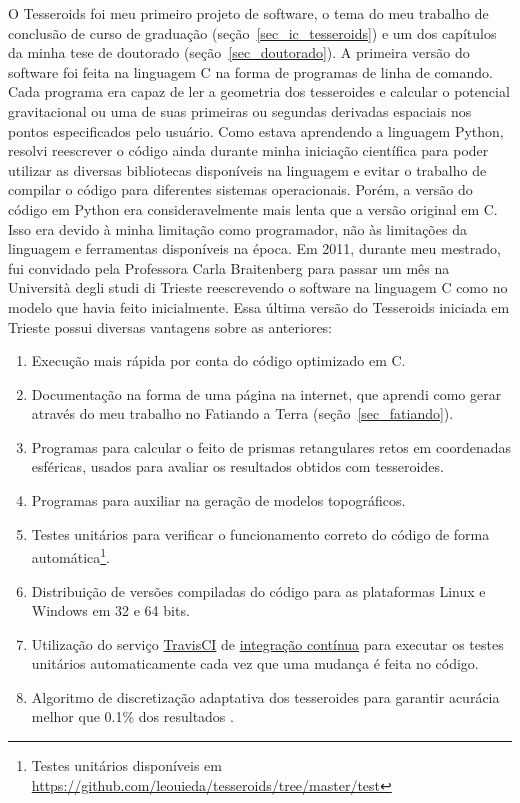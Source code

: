 \documentclass[10pt,a4paper,oneside]{book}
\newcommand{\Trieste}{Università degli studi di Trieste}
\begin{document}
O Tesseroids foi meu primeiro projeto de software, o tema do meu
trabalho de conclusão de curso de graduação (seção~\ref{sec_ic_tesseroids})
e um dos capítulos da minha tese de doutorado (seção~\ref{sec_doutorado}).
A primeira versão do software foi feita na linguagem C na forma de programas
de linha de comando.
Cada programa era capaz de ler a geometria dos tesseroides e calcular o
potencial gravitacional ou uma de suas primeiras ou segundas derivadas
espaciais nos pontos especificados pelo usuário.
Como estava aprendendo a linguagem Python, resolvi reescrever o código ainda
durante minha iniciação científica para poder utilizar as diversas bibliotecas
disponíveis na linguagem e evitar o trabalho de compilar o código para
diferentes sistemas operacionais.
Porém, a versão do código em Python era consideravelmente mais lenta que a
versão original em C.
Isso era devido à minha limitação como programador, não às limitações da
linguagem e ferramentas disponíveis na época.
Em 2011, durante meu mestrado, fui convidado pela Professora Carla Braitenberg
para passar um mês na \Trieste{} reescrevendo o software na linguagem C como no
modelo que havia feito inicialmente.
Essa última versão do Tesseroids iniciada em Trieste possui diversas vantagens
sobre as anteriores:

\begin{enumerate}
  \item Execução mais rápida por conta do código optimizado em C.
  \item Documentação na forma de uma página na internet, que aprendi como gerar
    através do meu trabalho no Fatiando a Terra (seção~\ref{sec_fatiando}).
  \item Programas para calcular o feito de prismas retangulares retos em
    coordenadas esféricas, usados para avaliar os resultados obtidos com
    tesseroides.
  \item Programas para auxiliar na geração de modelos topográficos.
  \item Testes unitários para verificar o funcionamento correto do código de
    forma automática\footnote{Testes unitários disponíveis em \url{https://github.com/leouieda/tesseroids/tree/master/test}}.
  \item Distribuição de versões compiladas do código para as plataformas Linux
    e Windows em 32 e 64 bits.
  \item Utilização do serviço \href{https://travis-ci.org/github/leouieda/tesseroids}{TravisCI} de
    \href{https://pt.wikipedia.org/wiki/Integra%C3%A7%C3%A3o_cont%C3%ADnua}{integração contínua}
    para executar os testes unitários automaticamente cada vez que uma mudança
    é feita no código.
  \item Algoritmo de discretização adaptativa dos tesseroides para garantir
    acurácia melhor que 0.1\% dos resultados \citep{Uieda2016}.
\end{enumerate}
\end{document}
